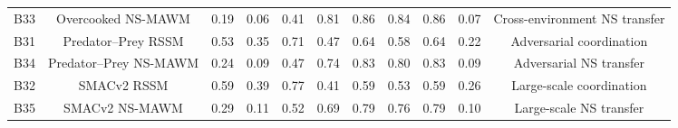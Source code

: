 \begin{table}[h!]
{\begin{tabular}{lcccccccccc}
            B33                      &
            Overcooked NS-MAWM       &
            0.19                     &
            0.06                     &
            0.41                     &
            0.81                     &
            0.86                     &
            0.84                     &
            0.86                     &
            0.07                     &
            Cross-environment NS transfer
            \\

            B31                      &
            Predator--Prey RSSM      &
            0.53                     &
            0.35                     &
            0.71                     &
            0.47                     &
            0.64                     &
            0.58                     &
            0.64                     &
            0.22                     &
            Adversarial coordination
            \\

            B34                      &
            Predator--Prey NS-MAWM   &
            0.24                     &
            0.09                     &
            0.47                     &
            0.74                     &
            0.83                     &
            0.80                     &
            0.83                     &
            0.09                     &
            Adversarial NS transfer
            \\

            B32                      &
            SMACv2 RSSM              &
            0.59                     &
            0.39                     &
            0.77                     &
            0.41                     &
            0.59                     &
            0.53                     &
            0.59                     &
            0.26                     &
            Large-scale coordination
            \\

            B35                      &
            SMACv2 NS-MAWM           &
            0.29                     &
            0.11                     &
            0.52                     &
            0.69                     &
            0.79                     &
            0.76                     &
            0.79                     &
            0.10                     &
            Large-scale NS transfer
            \\


\end{tabular}}
\end{table}

